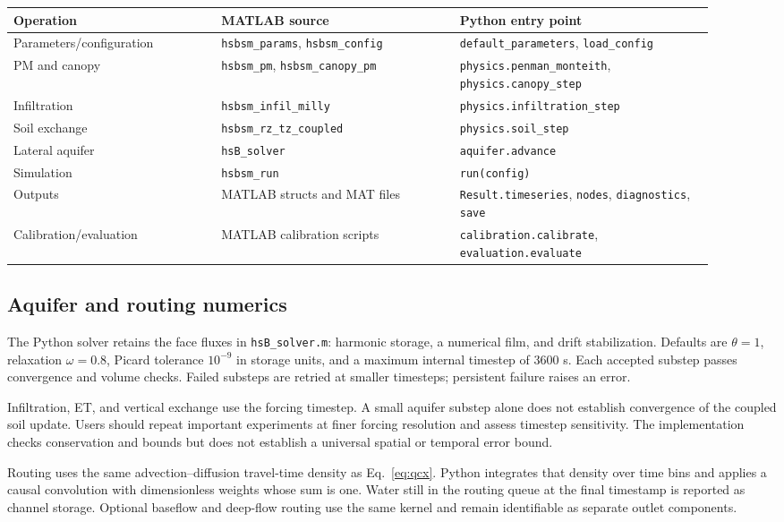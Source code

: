{\small
\begin{longtable}{p{0.27\linewidth}p{0.31\linewidth}p{0.33\linewidth}}
\toprule
Operation & MATLAB source & Python entry point \\
\midrule
\endhead
Parameters/configuration & \texttt{hsbsm\_params}, \texttt{hsbsm\_config} & \texttt{default\_parameters}, \texttt{load\_config} \\
PM and canopy & \texttt{hsbsm\_pm}, \texttt{hsbsm\_canopy\_pm} & \texttt{physics.penman\_monteith}, \texttt{physics.canopy\_step} \\
Infiltration & \texttt{hsbsm\_infil\_milly} & \texttt{physics.infiltration\_step} \\
Soil exchange & \texttt{hsbsm\_rz\_tz\_coupled} & \texttt{physics.soil\_step} \\
Lateral aquifer & \texttt{hsB\_solver} & \texttt{aquifer.advance} \\
Simulation & \texttt{hsbsm\_run} & \texttt{run(config)} \\
Outputs & MATLAB structs and MAT files & \texttt{Result.timeseries}, \texttt{nodes}, \texttt{diagnostics}, \texttt{save} \\
Calibration/evaluation & MATLAB calibration scripts & \texttt{calibration.calibrate}, \texttt{evaluation.evaluate} \\
\bottomrule
\end{longtable}
}

\subsection{Aquifer and routing numerics}

The Python solver retains the face fluxes in \texttt{hsB\_solver.m}: harmonic storage, a numerical film, and drift stabilization. Defaults are $\theta=1$, relaxation $\omega=0.8$, Picard tolerance $10^{-9}$ in storage units, and a maximum internal timestep of 3600 s. Each accepted substep passes convergence and volume checks. Failed substeps are retried at smaller timesteps; persistent failure raises an error.

Infiltration, ET, and vertical exchange use the forcing timestep. A small aquifer substep alone does not establish convergence of the coupled soil update. Users should repeat important experiments at finer forcing resolution and assess timestep sensitivity. The implementation checks conservation and bounds but does not establish a universal spatial or temporal error bound.

Routing uses the same advection--diffusion travel-time density as Eq.~\eqref{eq:qcx}. Python integrates that density over time bins and applies a causal convolution with dimensionless weights whose sum is one. Water still in the routing queue at the final timestamp is reported as channel storage. Optional baseflow and deep-flow routing use the same kernel and remain identifiable as separate outlet components.

